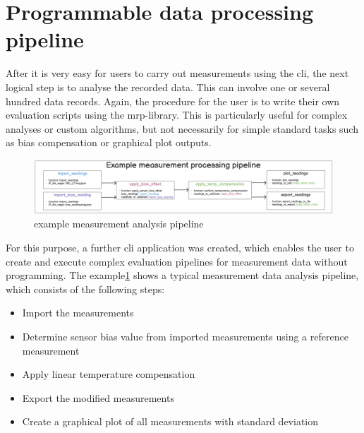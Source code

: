 \hypertarget{programmable-data-processing-pipeline}{%
\section{Programmable data processing
pipeline}\label{programmable-data-processing-pipeline}}

After it is very easy for users to carry out measurements using the
\gls{cli}, the next logical step is to analyse the recorded data. This
can involve one or several hundred data records. Again, the procedure
for the user is to write their own evaluation scripts using the
\gls{mrp}-library. This is particularly useful for complex analyses or
custom algorithms, but not necessarily for simple standard tasks such as
bias compensation or graphical plot outputs.

\begin{figure}
\centering
\includegraphics{./generated_images/border_example_measurement_analysis_pipeline.png}
\caption{example measurement analysis pipeline
\label{example_measurement_analysis_pipeline.png}}
\end{figure}

For this purpose, a further \gls{cli} application was created, which
enables the user to create and execute complex evaluation pipelines for
measurement data without programming. The
example\ref{example_measurement_analysis_pipeline.png} shows a typical
measurement data analysis pipeline, which consists of the following
steps:

\begin{itemize}
\tightlist
\item
  Import the measurements
\item
  Determine sensor bias value from imported measurements using a
  reference measurement
\item
  Apply linear temperature compensation
\item
  Export the modified measurements
\item
  Create a graphical plot of all measurements with standard deviation
\end{itemize}


